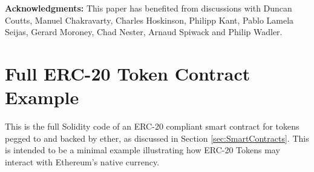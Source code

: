 \documentclass{llncs}
\begin{document}
\bigskip

\noindent
\textbf{Acknowledgments:} This paper has benefited from discussions with Duncan Coutts, Manuel Chakravarty, Charles Hoskinson, Philipp Kant, Pablo Lamela Seijas, Gerard Moroney, Chad Nester, Arnaud Spiwack and Philip Wadler.


%

%


\appendix

\section{Full ERC-20 Token Contract Example}
\label{appendix:ERC20}

This is the full Solidity code of an ERC-20 compliant smart contract for tokens pegged to and
backed by ether, as discussed in Section \ref{sec:SmartContracts}. This is intended to be a
minimal example illustrating how ERC-20 Tokens may interact with Ethereum's native currency.
\end{document}

